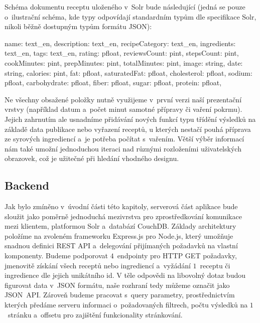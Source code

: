 Schéma dokumentu receptu uloženého v~Solr bude následující (jedná se pouze o~ilustrační schéma, kde typy odpovídají standardním typům dle specifikace Solr, nikoli běžně dostupným typům formátu JSON):

\begin{code}
{
    name: text_en,
    description: text_en,
    recipeCategory: text_en,
    ingredients: text_en,
    tags: text_en,
    rating: pfloat,
    reviewsCount: pint,
    stepsCount: pint,
    cookMinutes: pint,
    prepMinutes: pint,
    totalMinutes: pint,
    image: string,
    date: string,
    calories: pint,
    fat: pfloat,
    saturatedFat: pfloat,
    cholesterol: pfloat,
    sodium: pfloat,
    carbohydrate: pfloat,
    fiber: pfloat,
    sugar: pfloat,
    protein: pfloat,
}
\end{code}

Ne všechny obsažené položky nutně využijeme v~první verzi naší prezentační vrstvy (například datum a~počet minut samotné přípravy či vaření pokrmu). Jejich zahrnutím ale usnadníme přidávání nových funkcí typu třídění výsledků na základě data publikace nebo vyřazení receptů, u kterých nestačí pouhá příprava ze syrových ingrediencí a~je potřeba počítat s~vařením. Větší výběr informací nám také umožní jednoduchou iteraci nad různými rozloženími uživatelských obrazovek, což je užitečné při hledání vhodného designu.

\subsection{Backend}

Jak bylo zmíněno v~úvodní části této kapitoly, serverová část aplikace bude sloužit jako poměrně jednoduchá mezivrstva pro zprostředkování komunikace mezi klientem, platformou Solr a~databází CouchDB. Základy architektury položíme na zvoleném frameworku Express.js pro Node.js, který umožňuje snadnou definici REST API a~delegování přijímaných požadavků na vlastní komponenty. Budeme podporovat $4$~endpointy pro HTTP GET požadavky, jmenovitě získání všech receptů nebo ingrediencí a~vyžádání $1$~receptu či ingredience dle jejich unikátního id. V těle odpovědi na libovolný dotaz budou figurovat data v~JSON formátu, naše rozhraní tedy můžeme označit jako JSON~API. Zároveň budeme pracovat s~query parametry, prostřednictvím kterých předáme serveru informaci o~požadovaných filtrech, počtu výsledků na $1$~stránku a~offsetu pro zajištění funkcionality stránkování.

